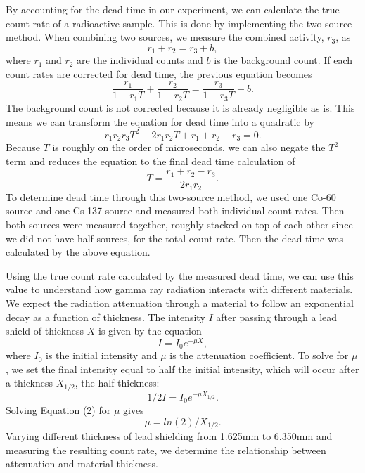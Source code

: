 \par By accounting for the dead time in our experiment, we can calculate the true count rate of a radioactive sample. This is done by implementing the two-source method. When combining two sources, we measure the combined activity, $r_3$, as 
\begin{equation}
r_1 + r_2 = r_3 + b,
\label{eq:combinedcountrate}
\end{equation}
where $r_1$ and $r_2$ are the individual counts and $b$ is the background count. If each count rates are corrected for dead time, the previous equation becomes
\begin{equation}
\frac{r_1}{1-r_1 T} + \frac{r_2}{1-r_2 T} = \frac{r_3}{1-r_3 T} + b.
\label{eq:cominedwithdeadtime}
\end{equation}
The background count is not corrected because it is already negligible as is. This means we can transform the equation for dead time into a quadratic by
\begin{equation}
r_1 r_2 r_3 T^2 - 2r_1 r_2 T + r_1 + r_2 - r_3 = 0.
\label{eq:quaddeadtime}
\end{equation}
Because $T$ is roughly on the order of microseconds, we can also negate the $T^2$ term and reduces the equation to the final dead time calculation of 
\begin{equation}
T = \frac{r_1 + r_2 - r_3}{2r_1 r_2}.
\label{eq:deadtime}
\end{equation}
To determine dead time through this two-source method, we used one Co-60 source and one Cs-137 source and measured both individual count rates. Then both sources were measured together, roughly stacked on top of each other since we did not have half-sources, for the total count rate. Then the dead time was calculated by the above equation.

\par Using the true count rate calculated by the measured dead time, we can use this value to understand how gamma ray radiation interacts with different materials. We expect the radiation attenuation through a material to follow an exponential decay as a function of thickness. The intensity $I$ after passing through a lead shield of thickness $X$ is given by the equation
\begin{equation}
I = I_0e^{-\mu X},
\end{equation}
where $I_0$ is the initial intensity and $\mu$ is the attenuation coefficient. To solve for $\mu$, we set the final intensity equal to half the initial intensity, which will occur after a thickness $X_{1/2}$, the half thickness:
\begin{equation}
1/2 I = I_0e^{-\mu X_{1/2}}.
\end{equation}
Solving Equation (2) for $\mu$ gives
\begin{equation}
\mu = ln(2)/{X_{1/2}}.
\end{equation}
 Varying different thickness of lead shielding from 1.625mm to 6.350mm and measuring the resulting count rate, we determine the relationship between attenuation and material thickness.

